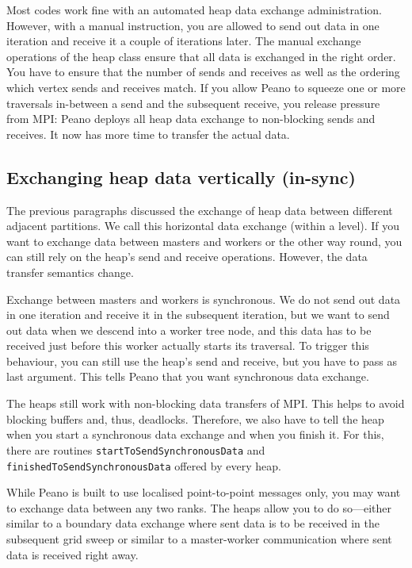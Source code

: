 Most codes work fine with an automated heap data exchange administration. 
However, with a manual instruction, you are allowed to send out data in one
iteration and receive it a couple of iterations later.
The manual exchange operations of the heap class ensure that all data is
exchanged in the right order. 
You have to ensure that the number of sends and receives as well as the ordering
which vertex sends and receives match.
If you allow Peano to squeeze one or more traversals in-between a send and the
subsequent receive, you release pressure from MPI: 
Peano deploys all heap data exchange to non-blocking sends and receives.
It now has more time to transfer the actual data.
 


\subsection{Exchanging heap data vertically (in-sync)}

The previous paragraphs discussed the exchange of heap data between different
adjacent partitions. 
We call this horizontal data exchange (within a level).
If you want to exchange data between masters and workers or the other way round,
you can still rely on the heap's send and receive operations.
However, the data transfer semantics change.


Exchange between masters and workers is synchronous.
We do not send out data in one iteration and receive it in the subsequent
iteration, but we want to send out data when we descend into a worker tree node,
and this data has to be received just before this worker actually starts its
traversal.
To trigger this behaviour, you can still use the heap's send and receive, but
you have to pass 
 as last argument.
This tells Peano that you want synchronous data exchange.


The heaps still work with non-blocking data transfers of MPI.
This helps to avoid blocking buffers and, thus, deadlocks. 
Therefore, we also have to tell the heap when you start a synchronous data
exchange and when you finish it.
For this, there are routines \texttt{startToSendSynchronousData} and
\texttt{finishedToSendSynchronousData} offered by every heap.


\begin{remark}
While Peano is built to use localised point-to-point messages only, you may want
to exchange data between any two ranks. The heaps allow you to do so---either
similar to a boundary data exchange where sent data is to be received in the
subsequent grid sweep or similar to a master-worker communication where sent
data is received right away.
\end{remark}


